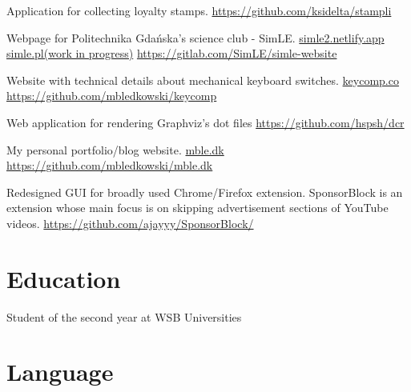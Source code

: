 \documentclass[11pt, a4paper, sans, colorlinks]{moderncv}
\begin{document}
{Application for collecting loyalty stamps. \href{https://github.com/ksidelta/stampli}{https://github.com/ksidelta/stampli}}

{Webpage for Politechnika Gdańska's science club - SimLE. \href{https://simle2.netlify.app}{simle2.netlify.app} \href{https://simle.pl}{simle.pl(work in progress)} \href{https://gitlab.com/SimLE/simle-website}{https://gitlab.com/SimLE/simle-website}}

{Website with technical details about mechanical keyboard switches. \href{https://keycomp.co}{keycomp.co} \href{https://github.com/mbledkowski/keycomp}{https://github.com/mbledkowski/keycomp}}

{Web application for rendering Graphviz's dot files \href{https://github.com/hspsh/dcr}{https://github.com/hspsh/dcr}}

{My personal portfolio/blog website. \href{https://mble.dk}{mble.dk} \href{https://github.com/mbledkowski/mble.dk}{https://github.com/mbledkowski/mble.dk}}

{Redesigned GUI for broadly used Chrome/Firefox extension. SponsorBlock is an extension whose main focus is on skipping advertisement sections of YouTube videos. \href{https://github.com/ajayyy/SponsorBlock}{https://github.com/ajayyy/SponsorBlock/}}

\pagebreak

\section{Education}

{Student of the second year at WSB Universities}

\section{Language}
\end{document}
